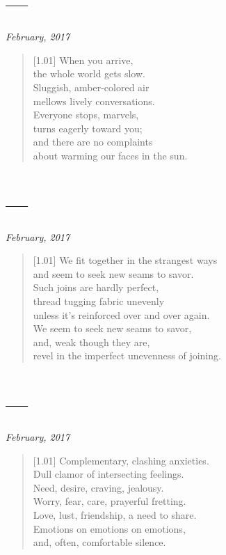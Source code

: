 \section*{---}

\hfill\textit{February, 2017}

\begin{verse}[1.01\textwidth]
  When you arrive,\\
  the whole world gets slow.\\
  Sluggish, amber-colored air\\
  mellows lively conversations.\\
  Everyone stops, marvels,\\
  turns eagerly toward you;\\
  and there are no complaints\\
  about warming our faces in the sun.
\end{verse}
\newpage

\section*{---}

\hfill\textit{February, 2017}

\begin{verse}[1.01\textwidth]
  We fit together in the strangest ways\\
  and seem to seek new seams to savor.\\
  Such joins are hardly perfect,\\
  thread tugging fabric unevenly\\
  unless it's reinforced over and over again.\\
  We seem to seek new seams to savor,\\
  and, weak though they are,\\
  revel in the imperfect unevenness of joining.
\end{verse}
\newpage

\section*{---}

\hfill\textit{February, 2017}

\begin{verse}[1.01\textwidth]
  Complementary, clashing anxieties.\\
  Dull clamor of intersecting feelings.\\
  Need, desire, craving, jealousy.\\
  Worry, fear, care, prayerful fretting.\\
  Love, lust, friendship, a need to share.\\
  Emotions on emotions on emotions,\\
  and, often, comfortable silence.
\end{verse}
\newpage

